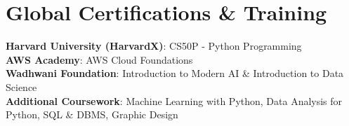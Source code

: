 \documentclass[letterpaper,10.5pt]{article}
\begin{document}
\section{Global Certifications \& Training}
 \begin{itemize}[leftmargin=0.15in, label={}]
    \small{\item{
     \textbf{Harvard University (HarvardX)}{: CS50P - Python Programming} \\
     \textbf{AWS Academy}{: AWS Cloud Foundations} \\
     \textbf{Wadhwani Foundation}{: Introduction to Modern AI \& Introduction to Data Science} \\
     \textbf{Additional Coursework}{: Machine Learning with Python, Data Analysis for Python, SQL \& DBMS, Graphic Design}
    }}
 \end{itemize}
\end{document}
